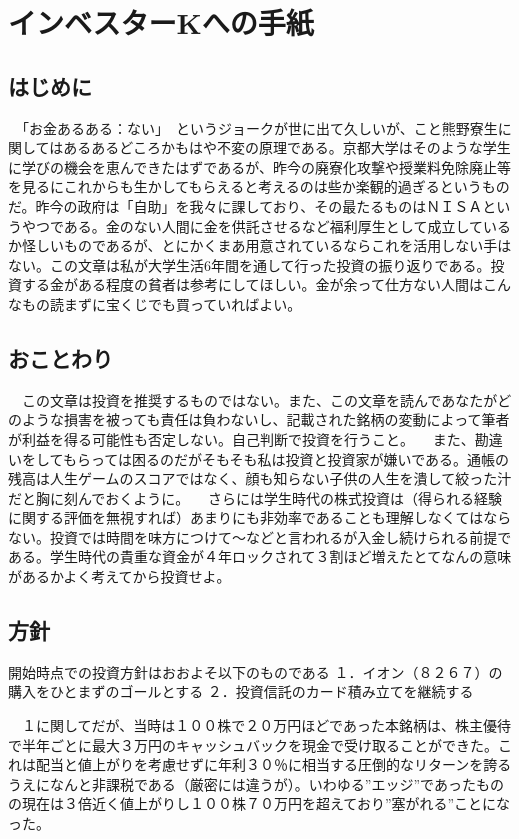 \section{インベスターKへの手紙}

\subsection{はじめに}
　「お金あるある：ない」　というジョークが世に出て久しいが、こと熊野寮生に関してはあるあるどころかもはや不変の原理である。京都大学はそのような学生に学びの機会を恵んできたはずであるが、昨今の廃寮化攻撃や授業料免除廃止等を見るにこれからも生かしてもらえると考えるのは些か楽観的過ぎるというものだ。昨今の政府は「自助」を我々に課しており、その最たるものはＮＩＳＡというやつである。金のない人間に金を供託させるなど福利厚生として成立しているか怪しいものであるが、とにかくまあ用意されているならこれを活用しない手はない。この文章は私が大学生活6年間を通して行った投資の振り返りである。投資する金がある程度の貧者は参考にしてほしい。金が余って仕方ない人間はこんなもの読まずに宝くじでも買っていればよい。

\subsection{おことわり}
　この文章は投資を推奨するものではない。また、この文章を読んであなたがどのような損害を被っても責任は負わないし、記載された銘柄の変動によって筆者が利益を得る可能性も否定しない。自己判断で投資を行うこと。
　また、勘違いをしてもらっては困るのだがそもそも私は投資と投資家が嫌いである。通帳の残高は人生ゲームのスコアではなく、顔も知らない子供の人生を潰して絞った汁だと胸に刻んでおくように。
　さらには学生時代の株式投資は（得られる経験に関する評価を無視すれば）あまりにも非効率であることも理解しなくてはならない。投資では時間を味方につけて～などと言われるが入金し続けられる前提である。学生時代の貴重な資金が４年ロックされて３割ほど増えたとてなんの意味があるかよく考えてから投資せよ。

\subsection{方針}
開始時点での投資方針はおおよそ以下のものである
１．イオン（８２６７）の購入をひとまずのゴールとする
２．投資信託のカード積み立てを継続する

　１に関してだが、当時は１００株で２０万円ほどであった本銘柄は、株主優待で半年ごとに最大３万円のキャッシュバックを現金で受け取ることができた。これは配当と値上がりを考慮せずに年利３０％に相当する圧倒的なリターンを誇るうえになんと非課税である（厳密には違うが）。いわゆる”エッジ”であったものの現在は３倍近く値上がりし１００株７０万円を超えており”塞がれる”ことになった。

